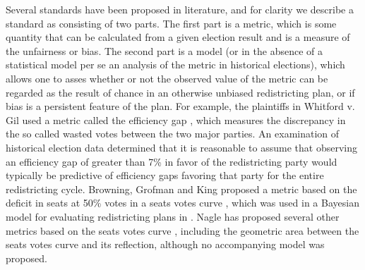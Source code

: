 \documentclass[preprint,12pt]{article}
\begin{document}
Several standards have been proposed in literature, and for clarity we describe a standard as consisting of two parts.
The first part is a metric, which is some quantity that can be calculated from a given election result and is a measure of the unfairness or bias.
The second part is a model (or in the absence of a statistical model per se an analysis of the metric in historical elections), which allows one to asses whether or not the observed value of the metric can be regarded as the result of chance in an otherwise unbiased redistricting plan, or if bias is a persistent feature of the plan.
For example, the plaintiffs in Whitford v. Gil used a metric called the efficiency gap \cite{Stephanopoulos_2014_}, which measures the discrepancy in the so called wasted votes between the two major parties.
An examination of historical election data determined that it is reasonable to assume that observing an efficiency gap of greater than 7\% in favor of the redistricting party would typically be predictive of efficiency gaps favoring that party for the entire redistricting cycle.
Browning, Grofman and King proposed a metric based on the deficit in seats at 50\% votes in a seats votes curve \cite{Browning_1987_,Grofman_2008_}, which was used in a Bayesian model for evaluating redistricting plans in \cite{Gelman_1994_,Gelman_1994_a}.
Nagle has proposed several other metrics based on the seats votes curve \cite{Nagle_2015_10.1089/elj.2015.0311}, including the geometric area between the seats votes curve and its reflection, although no accompanying model was proposed.
\end{document}
